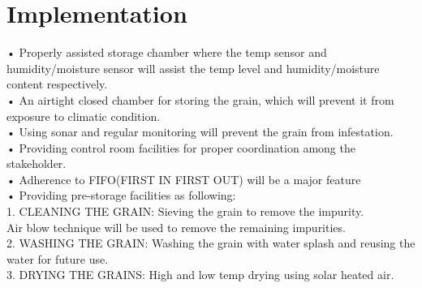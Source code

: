 \documentclass[]{article}
\begin{document}
\section*{Implementation}
•	Properly assisted storage chamber where the temp sensor and humidity/moisture sensor will assist the temp level and humidity/moisture content respectively. 
\\
•	 An airtight closed chamber for storing the grain, which will prevent it from exposure to climatic condition.
\\
•	Using sonar and regular monitoring will prevent the grain from infestation.
\\
•	Providing control room facilities for proper coordination among the stakeholder.
\\
•	Adherence to FIFO(FIRST IN FIRST OUT) will be a major feature 
\\
•	Providing pre-storage facilities as following:
\\
1.	CLEANING THE GRAIN: Sieving the grain to remove the impurity.
\\
Air blow technique will be used to remove the remaining impurities.
\\
2.	WASHING THE GRAIN:
Washing the grain with water splash and reusing the water for future use.
\\
3.	DRYING THE GRAINS: High and low temp drying using solar heated air.
\pagebreak
\end{document}

